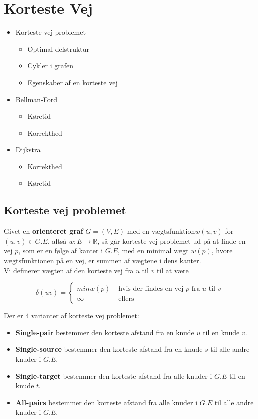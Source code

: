\section{Korteste Vej}
\hrulefill
\begin{itemize}
\item Korteste vej problemet
  \begin{itemize}
  \item Optimal delstruktur
  \item Cykler i grafen
  \item Egenskaber af en korteste vej
  \end{itemize}
\item Bellman-Ford
  \begin{itemize}
  \item Køretid
  \item Korrekthed
  \end{itemize}
\item Dijkstra
  \begin{itemize}
  \item Korrekthed
  \item Køretid
  \end{itemize}
\end{itemize}

\newpage
\subsection{Korteste vej problemet}
Givet en \textbf{orienteret graf} $G = (V,E)$ med en vægtsfunktion$w(u,v)$ for $(u,v) \in G.E$, altså $w : E \rightarrow \mathbb{R}$, så går korteste vej problemet ud på at finde en vej $p$, som er en følge af kanter i $G.E$, med en minimal vægt $w(p)$, hvore vægtsfunktionen på en vej, er summen af vægtene i dens kanter.\\

Vi definerer vægten af den korteste vej fra $u$ til $v$ til at være

$$
\delta(uv) =
\begin{cases}
  min{w(p)} & \text{ hvis der findes en vej } p \text{ fra } u \text{ til } v\\
  \infty & \text{ ellers}
\end{cases}
$$

Der er 4 varianter af korteste vej problemet:
\begin{itemize}
\item \textbf{Single-pair} bestemmer den korteste afstand fra en knude $u$ til en knude $v$.
\item \textbf{Single-source} bestemmer den korteste afstand fra en knude $s$ til alle andre knuder i $G.E$.
\item \textbf{Single-target} bestemmer den korteste afstand fra alle knuder i $G.E$ til en knude $t$.
\item \textbf{All-pairs} bestemmer den korteste afstand fra alle knuder i $G.E$ til alle andre knuder i $G.E$.
\end{itemize}

